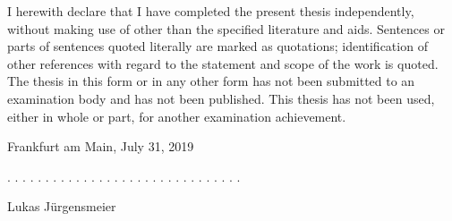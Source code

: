 \documentclass[12pt,a4paper]{article}
\begin{document}
I herewith declare that I have completed the present thesis independently, without making use of
other than the specified literature and aids. Sentences or parts of sentences quoted literally are
marked as quotations; identification of other references with regard to the statement and scope of
the work is quoted. The thesis in this form or in any other form has not been submitted to an examination body and has not been published.
This thesis has not been used, either in whole or part, for another examination achievement.

\vspace{1cm}

Frankfurt am Main, July 31, 2019
\vspace{2cm}

. . . . . . . . . . . . . . . . . . . . . . . . . . . . . . .
\vspace{0.1cm}

Lukas J\"urgensmeier
\end{document}
